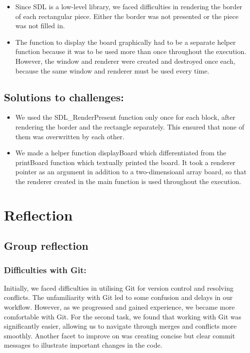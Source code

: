 \documentclass{article}
\begin{document}
\begin{itemize}
    \item Since SDL is a low-level library, we faced difficulties in rendering the border of each rectangular piece. Either the border was not presented or the piece was not filled in. 
    \item The function to display the board graphically had to be a separate helper function because it was to be used more than once throughout the execution. However, the window and renderer were created and destroyed once each, because the same window and renderer must be used every time. 
\end{itemize}

\subsection{Solutions to challenges:}

\begin{itemize}
    \item We used the SDL\_RenderPresent function only once for each block, after rendering the border and the rectangle separately. This ensured that none of them was overwritten by each other. 
    \item We made a helper function displayBoard which differentiated from the printBoard function which textually printed the board. It took a renderer pointer as an argument in addition to a two-dimensioanl array board, so that the renderer created in the main function is used throughout the execution.  
\end{itemize}

\vspace{20pt}

\section{Reflection}

\subsection{Group reflection}

\subsubsection{Difficulties with Git:}

Initially, we faced difficulties in utilising Git for version control and resolving conflicts. The unfamiliarity with Git led to some confusion and delays in our workflow. However, as we progressed and gained experience, we became more comfortable with Git. For the second task, we found that working with Git was significantly easier, allowing us to navigate through merges and conflicts more smoothly. Another facet to improve on was creating concise but clear commit messages to illustrate important changes in the code.
\end{document}
